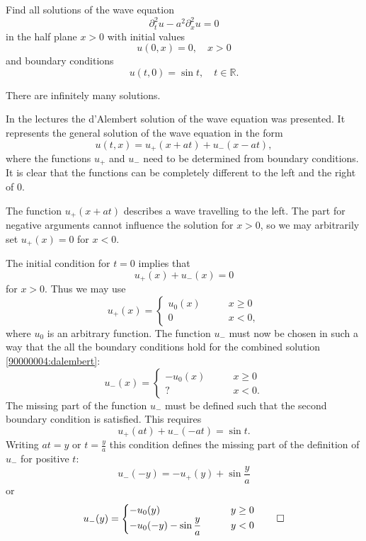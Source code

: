Find all solutions of the wave equation
\[
\partial_t^2u-a^2\partial_x^2u=0
\]
in the half plane $x>0$ with initial values
\[
u(0,x)=0,\quad x>0
\]
and boundary conditions
\[
u(t,0)=\sin t,\quad t\in\mathbb R.
\]

\begin{hinweis}
There are infinitely many solutions.
\end{hinweis}

\begin{loesung}
In the lectures the d'Alembert solution of the wave equation was
presented.
It represents the general solution of the wave equation in the form
\begin{equation}
u(t,x)
=
u_+(x+at)+u_-(x-at),
\label{90000004:dalembert}
\end{equation}
where the functions $u_+$ and $u_-$
need to be determined from boundary conditions.
It is clear that the functions can be completely different to the left
and the right of $0$.

The function $u_+(x+at)$ describes a wave travelling to the left.
The part for negative arguments cannot influence the solution for $x>0$,
so we may arbitrarily set $u_+(x)=0$ for $x<0$.

The initial condition for $t=0$ implies that
\[
u_+(x)+u_-(x)=0
\]
for $x>0$.
Thus we may use
\[
u_+(x)=\begin{cases}u_0(x)&\qquad x\ge 0\\
0&\qquad x<0,
\end{cases}
\]
where $u_0$ is an arbitrary function.
The function $u_-$ must now be chosen in such a way that the
all the boundary conditions hold for the 
combined solution \eqref{90000004:dalembert}:
\[
u_-(x)=\begin{cases}
-u_0(x)&\qquad x\ge 0\\
?&\qquad x<0.
\end{cases}
\]
The missing part of the function $u_-$ must be defined such that the
second boundary condition is satisfied.
This requires
\[
u_+(at)+u_-(-at)=\sin t.
\]
Writing 
$at=y$ or $t=\frac{y}{a}$
this condition defines the missing part of the definition of $u_-$
for positive $t$:
\[
u_-(-y)=-u_+(y)+\sin \frac{y}{a}
\]
or
\[
u_-(y)=\begin{cases}
-u_0(y)&\qquad y\ge 0\\
-u_0(-y)-\sin{\displaystyle\frac{y}{a}}&\qquad y<0
\end{cases}
\qedhere
\]
\end{loesung}
